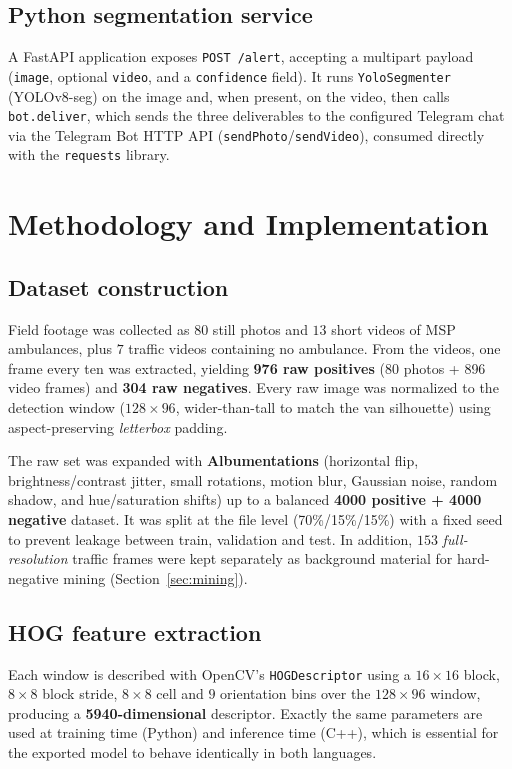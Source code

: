 \documentclass[12pt, a4paper]{article}
\begin{document}
\subsection{Python segmentation service}
A FastAPI \cite{ramirez2018fastapi} application exposes \texttt{POST /alert}, accepting a
multipart payload (\texttt{image}, optional \texttt{video}, and a \texttt{confidence} field).
It runs \texttt{YoloSegmenter} (YOLOv8-seg) on the image and, when present, on the video, then
calls \texttt{bot.deliver}, which sends the three deliverables to the configured Telegram chat
via the Telegram Bot HTTP API \cite{telegram2024botapi}
(\texttt{sendPhoto}/\texttt{sendVideo}), consumed directly with the \texttt{requests} library.

\section{Methodology and Implementation}
\label{sec:impl}

\subsection{Dataset construction}
Field footage was collected as $80$ still photos and $13$ short videos of MSP ambulances,
plus $7$ traffic videos containing no ambulance. From the videos, one frame every ten was
extracted, yielding \textbf{976 raw positives} (80 photos + 896 video frames) and
\textbf{304 raw negatives}. Every raw image was normalized to the detection window
($128 \times 96$, wider-than-tall to match the van silhouette) using aspect-preserving
\emph{letterbox} padding.

The raw set was expanded with \textbf{Albumentations} \cite{buslaev2020albumentations}
(horizontal flip, brightness/contrast jitter, small rotations, motion blur, Gaussian noise,
random shadow, and hue/saturation shifts) up to a balanced
\textbf{4000 positive + 4000 negative} dataset. It was split at the file level
(70\%/15\%/15\%) with a fixed seed to prevent leakage between train, validation and test.
In addition, $153$ \emph{full-resolution} traffic frames were kept separately as background
material for hard-negative mining (Section~\ref{sec:mining}).

\subsection{HOG feature extraction}
Each window is described with OpenCV's \texttt{HOGDescriptor}
\cite{dalal2005histograms} using a $16\times16$ block, $8\times8$ block stride,
$8\times8$ cell and $9$ orientation bins over the $128\times96$ window, producing a
\textbf{5940-dimensional} descriptor. Exactly the same parameters are used at training time
(Python) and inference time (C++), which is essential for the exported model to behave
identically in both languages.
\end{document}
